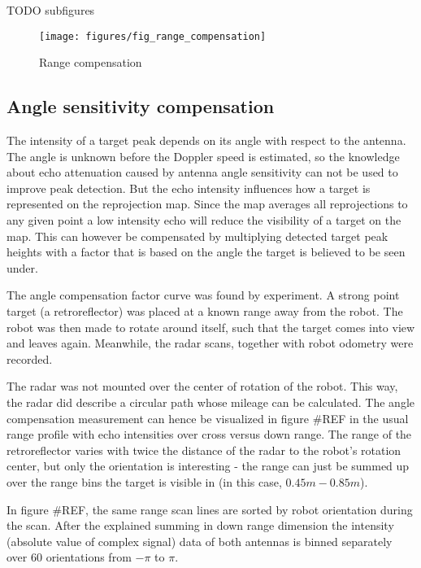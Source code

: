 TODO subfigures
\begin{figure}[htbp]
    \centering
    \label{fig:fig_range_compensation}
    \texttt{[image: figures/fig\_range\_compensation]}
    \caption{Range compensation}
\end{figure}

\subsection{Angle sensitivity
compensation}\label{angle-sensitivity-compensation}

The intensity of a target peak depends on its angle with respect to the
antenna. The angle is unknown before the Doppler speed is estimated, so
the knowledge about echo attenuation caused by antenna angle sensitivity
can not be used to improve peak detection. But the echo intensity
influences how a target is represented on the reprojection map. Since
the map averages all reprojections to any given point a low intensity
echo will reduce the visibility of a target on the map. This can however
be compensated by multiplying detected target peak heights with a factor
that is based on the angle the target is believed to be seen under.

The angle compensation factor curve was found by experiment. A strong
point target (a retroreflector) was placed at a known range away from
the robot. The robot was then made to rotate around itself, such that
the target comes into view and leaves again. Meanwhile, the radar scans,
together with robot odometry were recorded.

The radar was not mounted over the center of rotation of the robot. This
way, the radar did describe a circular path whose mileage can be
calculated. The angle compensation measurement can hence be visualized
in figure \#REF in the usual range profile with echo intensities over
cross versus down range. The range of the retroreflector varies with
twice the distance of the radar to the robot's rotation center, but only
the orientation is interesting - the range can just be summed up over
the range bins the target is visible in (in this case,
\(0.45m - 0.85m\)).

In figure \#REF, the same range scan lines are sorted by robot
orientation during the scan. After the explained summing in down range
dimension the intensity (absolute value of complex signal) data of both
antennas is binned separately over 60 orientations from \(-\pi\) to
\(\pi\).

